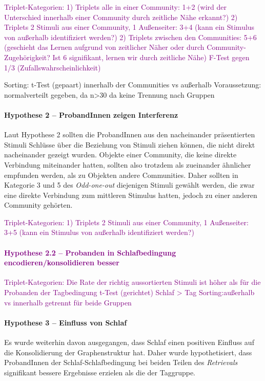 \documentclass[preprint,12pt]{elsarticle}
\begin{document}
\textcolor{purple}{Triplet-Kategorien:
1) Triplets alle in einer Community: 1+2 (wird der Unterschied innerhalb einer Community durch zeitliche Nähe erkannt?)
2) Triplets 2 Stimuli aus einer Community, 1 Außenseiter: 3+4 (kann ein Stimulus von außerhalb identifiziert werden?)
2) Triplets zwischen den Communities: 5+6 (geschieht das Lernen aufgrund von zeitlicher Näher oder durch Community-Zugehörigkeit? Ist 6 signifikant, lernen wir durch zeitliche Nähe)
F-Test gegen 1/3 (Zufallswahrscheinlichkeit)}

Sorting:
t-Test (gepaart) innerhalb der Communities vs außerhalb
Voraussetzung: normalverteilt gegeben, da n>30 da keine Trennung nach Gruppen

\paragraph{Hypothese 2 – ProbandInnen zeigen Interferenz}
Laut Hypothese 2 sollten die ProbandInnen aus den nacheinander präsentierten Stimuli Schlüsse über die Beziehung von Stimuli ziehen können, die nicht direkt nacheinander gezeigt wurden. Objekte einer Community, die keine direkte Verbindung miteinander hatten, sollten also trotzdem als zueinander ähnlicher empfunden werden, als zu Objekten andere Communities.
Daher sollten in Kategorie 3 und 5 des \textit{Odd-one-out} diejenigen Stimuli gewählt werden, die zwar eine direkte Verbindung zum mittleren Stimulus hatten, jedoch zu einer anderen Community gehörten.

\textcolor{purple}{Triplet-Kategorien:
1) Triplets 2 Stimuli aus einer Community, 1 Außenseiter: 3+5 (kann ein Stimulus von außerhalb identifiziert werden?) \paragraph{Hypothese 2.2 – Probanden in Schlafbedingung encodieren/konsolidieren besser} Triplet-Kategorien: Die Rate der richtig aussortierten Stimuli ist höher als für die Probanden der Tagbedingung t-Test (gerichtet) Schlaf > Tag Sorting:außerhalb vs innerhalb getrennt für beide Gruppen}

\paragraph{Hypothese 3 – Einfluss von Schlaf}
Es wurde weiterhin davon ausgegangen, dass Schlaf einen positiven Einfluss auf die Konsolidierung der Graphenstruktur hat. Daher wurde hypothetisiert, dass ProbandInnen der Schlaf-Schlafbedingung bei beiden Teilen des \textit{Retrievals} signifikant bessere Ergebnisse erzielen als die der Taggruppe.
\end{document}
